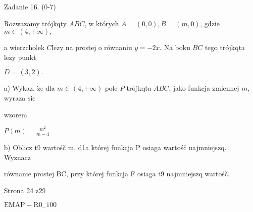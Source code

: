\documentclass[a4paper,12pt]{article}
\begin{document}
Zadanie 16. (0-7)

Rozwazamy trójkqty $ABC$, w których $A=(0,0), B=(m,0)$, gdzie $m\in(4,+\infty),$

a wierzcholek $C \mathrm{l}\mathrm{e}\dot{\mathrm{z}}\mathrm{y}$ na prostej o równaniu $y=-2x$. Na boku $BC$ tego trójkqta $\mathrm{l}\mathrm{e}\dot{\mathrm{z}}\mathrm{y}$ punkt

$D=(3,2).$

a) Wykaz, $\dot{\mathrm{z}}\mathrm{e}$ dla $m\in(4,+\infty)$ pole $P$ trójkqta $ABC$, jako funkcja zmiennej $m$, wyraza $\mathrm{s}\mathrm{i}\mathrm{e}$

wzorem

$P(m)=\displaystyle \frac{m^{2}}{m-4}$

b) Oblicz t9 wartośč m, d1a której funkcja P osiaga wartośč najmniejszq. Wyznacz

równanie prostej BC, przy której funkcja F osiaga t9 najmniejszq wartośč.

Strona 24 z29

$\mathrm{E}\mathrm{M}\mathrm{A}\mathrm{P}-\mathrm{R}0_{-}100$
\end{document}
